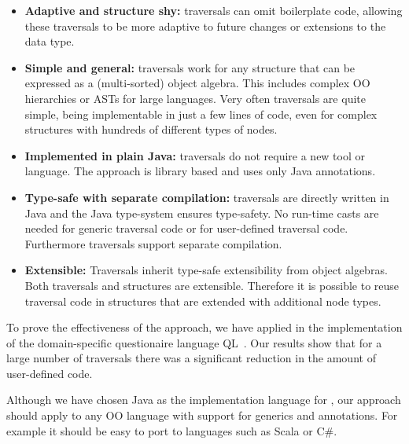 \begin{itemize}

\item {\bf Adaptive and structure shy:} \name traversals can omit
  boilerplate code, allowing these traversals to be more adaptive to
  future changes or extensions to the data type.

\item {\bf Simple and general:} \name traversals work for any
  structure that can be expressed as a (multi-sorted) object
  algebra. This includes complex OO hierarchies or ASTs for large
  languages. Very often traversals are quite simple, being
  implementable in just a few lines of code, even for complex
  structures with hundreds of different types of nodes.

\item {\bf Implemented in plain Java:} \name traversals do not require
  a new tool or language. The approach is library based and uses only
  Java annotations. 

\item {\bf Type-safe with separate compilation:} \name traversals are directly written in Java
  and the Java type-system ensures type-safety. No run-time casts are
  needed for generic traversal code or for user-defined traversal
  code. Furthermore \name traversals support separate compilation. 

\item {\bf Extensible:} Traversals inherit type-safe
  extensibility from object algebras. Both traversals and structures
  are extensible. Therefore it is possible to
  reuse traversal code in structures that are extended with additional
  node types.


\end{itemize}

To prove the effectiveness of the approach, we have applied \name 
in the implementation of the domain-specific questionaire 
language QL~\cite{gouseti14extensible}. 
Our results show that for a large number of traversals 
there was a significant reduction in the amount of user-defined code.

Although we have chosen Java as the implementation language for \Name,
our approach should apply to any OO language with support for generics
and annotations. For example it should be easy to port \name to
languages such as Scala or C\#.

